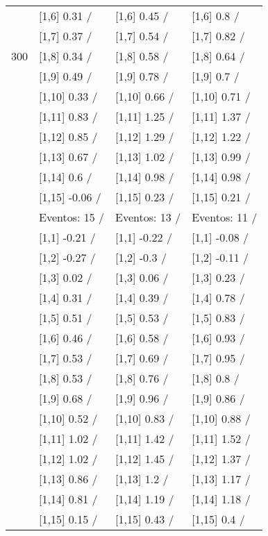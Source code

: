 \begin{table}
\begin{tabular}[t]{llll}
 & {}[1,6] 0.31  / & {}[1,6] 0.45  / & {}[1,6] 0.8  /\\
 & {}[1,7] 0.37  / & {}[1,7] 0.54  / & {}[1,7] 0.82  /\\
300 & {}[1,8] 0.34  / & {}[1,8] 0.58  / & {}[1,8] 0.64  /\\
\addlinespace
 & {}[1,9] 0.49  / & {}[1,9] 0.78  / & {}[1,9] 0.7  /\\
 & {}[1,10] 0.33  / & {}[1,10] 0.66  / & {}[1,10] 0.71  /\\
 & {}[1,11] 0.83  / & {}[1,11] 1.25  / & {}[1,11] 1.37  /\\
 & {}[1,12] 0.85  / & {}[1,12] 1.29  / & {}[1,12] 1.22  /\\
 & {}[1,13] 0.67  / & {}[1,13] 1.02  / & {}[1,13] 0.99  /\\
\addlinespace
 & {}[1,14] 0.6  / & {}[1,14] 0.98  / & {}[1,14] 0.98  /\\
 & {}[1,15] -0.06  / & {}[1,15] 0.23  / & {}[1,15] 0.21  /\\
 & Eventos:  15 / & Eventos:  13 / & Eventos:  11 /\\
 & {}[1,1] -0.21  / & {}[1,1] -0.22  / & {}[1,1] -0.08  /\\
 & {}[1,2] -0.27  / & {}[1,2] -0.3  / & {}[1,2] -0.11  /\\
\addlinespace
 & {}[1,3] 0.02  / & {}[1,3] 0.06  / & {}[1,3] 0.23  /\\
 & {}[1,4] 0.31  / & {}[1,4] 0.39  / & {}[1,4] 0.78  /\\
 & {}[1,5] 0.51  / & {}[1,5] 0.53  / & {}[1,5] 0.83  /\\
 & {}[1,6] 0.46  / & {}[1,6] 0.58  / & {}[1,6] 0.93  /\\
 & {}[1,7] 0.53  / & {}[1,7] 0.69  / & {}[1,7] 0.95  /\\
\addlinespace
500 & {}[1,8] 0.53  / & {}[1,8] 0.76  / & {}[1,8] 0.8  /\\
 & {}[1,9] 0.68  / & {}[1,9] 0.96  / & {}[1,9] 0.86  /\\
 & {}[1,10] 0.52  / & {}[1,10] 0.83  / & {}[1,10] 0.88  /\\
 & {}[1,11] 1.02  / & {}[1,11] 1.42  / & {}[1,11] 1.52  /\\
 & {}[1,12] 1.02  / & {}[1,12] 1.45  / & {}[1,12] 1.37  /\\
\addlinespace
 & {}[1,13] 0.86  / & {}[1,13] 1.2  / & {}[1,13] 1.17  /\\
 & {}[1,14] 0.81  / & {}[1,14] 1.19  / & {}[1,14] 1.18  /\\
 & {}[1,15] 0.15  / & {}[1,15] 0.43  / & {}[1,15] 0.4  /\\
\bottomrule
\end{tabular}
\end{table}
